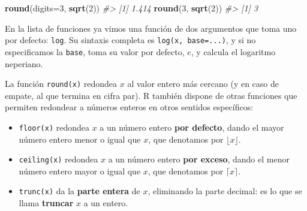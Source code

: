 \documentclass[
]{book}
\newenvironment{Shaded}{\begin{snugshade}}{\end{snugshade}}
\newcommand{\CommentTok}[1]{\textcolor[rgb]{0.56,0.35,0.01}{\textit{#1}}}
\newcommand{\DataTypeTok}[1]{\textcolor[rgb]{0.13,0.29,0.53}{#1}}
\newcommand{\DecValTok}[1]{\textcolor[rgb]{0.00,0.00,0.81}{#1}}
\newcommand{\KeywordTok}[1]{\textcolor[rgb]{0.13,0.29,0.53}{\textbf{#1}}}
\newcommand{\NormalTok}[1]{#1}
\theoremstyle{definition}
\theoremstyle{definition}
\theoremstyle{definition}
\theoremstyle{remark}
\begin{document}
\begin{Shaded}
\begin{Highlighting}[]
\KeywordTok{round}\NormalTok{(}\DataTypeTok{digits=}\DecValTok{3}\NormalTok{, }\KeywordTok{sqrt}\NormalTok{(}\DecValTok{2}\NormalTok{))}
\CommentTok{\#\textgreater{} [1] 1.414}
\KeywordTok{round}\NormalTok{(}\DecValTok{3}\NormalTok{, }\KeywordTok{sqrt}\NormalTok{(}\DecValTok{2}\NormalTok{))}
\CommentTok{\#\textgreater{} [1] 3}
\end{Highlighting}
\end{Shaded}

En la lista de funciones ya vimos una función de dos argumentos que toma uno por defecto: \texttt{log}. Su sintaxis completa es \texttt{log(x,\ base=...)}, y si no especificamos la \texttt{base}, toma su valor por defecto, \(e\), y calcula el logaritmo neperiano.

La función \texttt{round(x)} redondea \(x\) al valor entero más cercano (y en caso de empate, al que termina en cifra par). R también dispone de otras funciones que permiten redondear a números enteros en otros sentidos específicos:

\begin{itemize}
\item
  \texttt{floor(x)} redondea \(x\) a un número entero \textbf{por defecto}, dando el mayor número entero menor o igual que \(x\), que denotamos por \(\lfloor x\rfloor\).
\item
  \texttt{ceiling(x)} redondea \(x\) a un número entero \textbf{por exceso}, dando el menor número entero mayor o igual que \(x\), que denotamos por \(\lceil x\rceil\).
\item
  \texttt{trunc(x)} da la \textbf{parte entera} de \(x\), eliminando la parte decimal: es lo que se llama \textbf{truncar} \(x\) a un entero.
\end{itemize}
\end{document}
